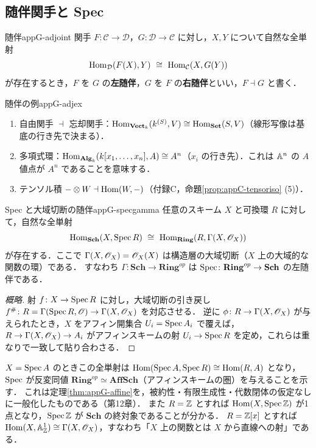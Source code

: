 \subsection*{随伴関手と Spec}

\begin{mydef}{随伴}{appG-adjoint}
関手 $F\colon\mathcal C\to\mathcal D$，$G\colon\mathcal D\to\mathcal C$ に対し，$X,Y$ について自然な全単射
\[
\operatorname{Hom}_{\mathcal D}(F(X),Y)\ \cong\ \operatorname{Hom}_{\mathcal C}(X,G(Y))
\]
が存在するとき，$F$ を $G$ の\textbf{左随伴}，$G$ を $F$ の\textbf{右随伴}といい，$F\dashv G$ と書く．
\end{mydef}

\begin{myex}{随伴の例}{appG-adjex}
\begin{enumerate}
\item 自由関手 $\dashv$ 忘却関手：$\operatorname{Hom}_{\mathbf{Vect}_k}(k^{(S)},V)\cong\operatorname{Hom}_{\mathbf{Set}}(S,V)$（線形写像は基底の行き先で決まる）．
\item 多項式環：$\operatorname{Hom}_{\mathbf{Alg}_k}(k[x_1,\dots,x_n],A)\cong A^n$（$x_i$ の行き先）．これは $\mathbb{A}^n$ の $A$ 値点が $A^n$ であることを意味する．
\item テンソル積 $-\otimes W\dashv\operatorname{Hom}(W,-)$（付録C，命題\ref{prop:appC-tensoriso} (5)）．
\end{enumerate}
\end{myex}

\begin{mythm}{Spec と大域切断の随伴}{appG-specgamma}
任意のスキーム $X$ と可換環 $R$ に対して，自然な全単射
\[
\Hom_{\mathbf{Sch}}(X,\Spec R)\ \cong\ \Hom_{\mathbf{Ring}}(R,\Gamma(X,\OO_X))
\]
が存在する．ここで $\Gamma(X,\mathscr{O}_X)=\mathscr{O}_X(X)$ は構造層の大域切断（$X$ 上の大域的な関数の環）である．
すなわち $\Gamma\colon\mathbf{Sch}\to\mathbf{Ring}^{op}$ は $\operatorname{Spec}\colon\mathbf{Ring}^{op}\to\mathbf{Sch}$ の左随伴である．
\end{mythm}
\begin{proof}[概略]
射 $f\colon X\to\operatorname{Spec} R$ に対し，大域切断の引き戻し $f^\#\colon R=\Gamma(\operatorname{Spec} R,\mathscr{O})\to\Gamma(X,\mathscr{O}_X)$ を対応させる．
逆に $\phi\colon R\to\Gamma(X,\mathscr{O}_X)$ が与えられたとき，$X$ をアフィン開集合 $U_i=\operatorname{Spec} A_i$ で覆えば，
$R\to\Gamma(X,\mathscr{O}_X)\to A_i$ がアフィンスキームの射 $U_i\to\operatorname{Spec} R$ を定め，これらは重なりで一致して貼り合わさる．
\end{proof}

$X=\operatorname{Spec} A$ のときこの全単射は $\operatorname{Hom}(\operatorname{Spec} A,\operatorname{Spec} R)\cong\operatorname{Hom}(R,A)$ となり，
$\operatorname{Spec}$ が反変同値 $\mathbf{Ring}^{op}\simeq\mathbf{AffSch}$（アフィンスキームの圏）を与えることを示す．
これは定理\ref{thm:appG-affine}を，被約性・有限生成性・代数閉体の仮定なしに一般化したものである（第12章）．
また $R=\mathbb{Z}$ とすれば $\operatorname{Hom}(X,\operatorname{Spec}\mathbb{Z})$ が1点となり，$\operatorname{Spec}\mathbb{Z}$ が $\mathbf{Sch}$ の終対象であることが分かる．
$R=\mathbb{Z}[x]$ とすれば $\operatorname{Hom}(X,\mathbb{A}^1_{\mathbb{Z}})\cong\Gamma(X,\mathscr{O}_X)$，すなわち「$X$ 上の関数とは $X$ から直線への射」である．

